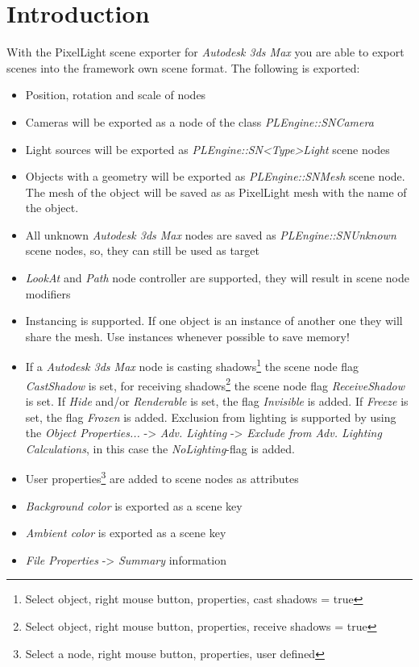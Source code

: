 \chapter{Introduction}
With the PixelLight scene exporter for \emph{Autodesk 3ds Max} you are able to export scenes into the framework own scene format. The following is exported:
\begin{itemize}
\item{Position, rotation and scale of nodes}
\item{Cameras will be exported as a node of the class \emph{PLEngine::SNCamera}}
\item{Light sources will be exported as \emph{PLEngine::SN<Type>Light} scene nodes}
\item{Objects with a geometry will be exported as \emph{PLEngine::SNMesh} scene node. The mesh of the object will be saved as as PixelLight mesh with the name of the object.}
\item{All unknown \emph{Autodesk 3ds Max} nodes are saved as \emph{PLEngine::SNUnknown} scene nodes, so, they can still be used as target}
\item{\emph{LookAt} and \emph{Path} node controller are supported, they will result in scene node modifiers}
\item{Instancing is supported. If one object is an instance of another one they will share the mesh. Use instances whenever possible to save memory!}
\item{If a \emph{Autodesk 3ds Max} node is casting shadows\footnote{Select object, right mouse button, properties, cast shadows = true} the scene node flag \emph{CastShadow} is set, for receiving shadows\footnote{Select object, right mouse button, properties, receive shadows = true} the scene node flag \emph{ReceiveShadow} is set. If \emph{Hide} and/or \emph{Renderable} is set, the flag \emph{Invisible} is added. If \emph{Freeze} is set, the flag \emph{Frozen} is added. Exclusion from lighting is supported by using the \emph{Object Properties...} -> \emph{Adv. Lighting} -> \emph{Exclude from Adv. Lighting Calculations}, in this case the \emph{NoLighting}-flag is added.}
\item{User properties\footnote{Select a node, right mouse button, properties, user defined} are added to scene nodes as attributes}
\item{\emph{Background color} is exported as a scene key}
\item{\emph{Ambient color} is exported as a scene key}
\item{\emph{File Properties} -> \emph{Summary} information}

\end{itemize}
